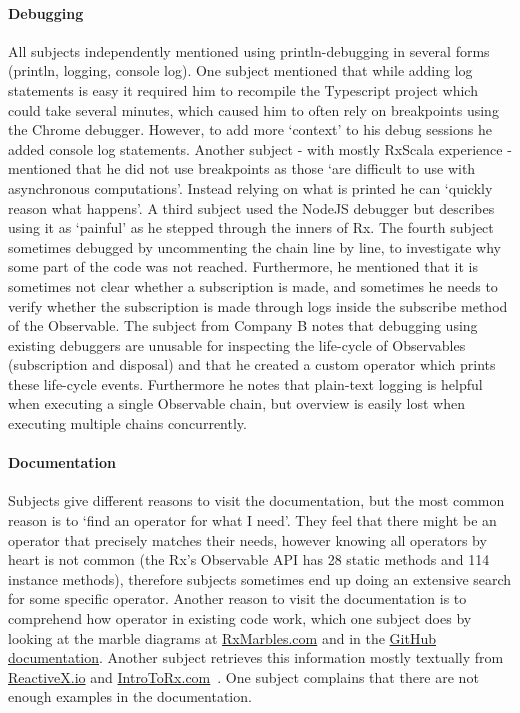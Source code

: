 \paragraph{Debugging}
All subjects independently mentioned using println-debugging in several forms (println, logging, console log).
One subject mentioned that while adding log statements is easy it required him to recompile the Typescript project which could take several minutes, 
which caused him to often rely on breakpoints using the Chrome debugger. However, to add more `context' to his debug sessions he added console log statements.
Another subject - with mostly RxScala experience - mentioned that he did not use breakpoints as those `are difficult to use with asynchronous computations'. 
Instead relying on what is printed he can `quickly reason what happens'.
A third subject used the NodeJS debugger but describes using it as `painful' as he stepped through the inners of Rx.
The fourth subject sometimes debugged by uncommenting the chain line by line, to investigate why some part of the code was not reached. Furthermore, he mentioned that it is sometimes not clear whether a subscription is made, and sometimes he needs to verify whether the subscription is made through logs inside the subscribe method of the Observable.
The subject from Company B notes that debugging using existing debuggers are unusable for inspecting the life-cycle of Observables (subscription and disposal) and that he created a custom  operator which prints these life-cycle events. Furthermore he notes that plain-text logging is helpful when executing a single Observable chain, but overview is easily lost when executing multiple chains concurrently.

\paragraph{Documentation}
Subjects give different reasons to visit the documentation, but the most common reason is to `find an operator for what I need'. They feel that there might be an operator that precisely matches their needs, however knowing all operators by heart is not common (the Rx's Observable API has 28 static methods and 114 instance methods), therefore subjects sometimes end up doing an extensive search for some specific operator. Another reason to visit the documentation is to comprehend how operator in existing code work, which one subject does by looking at the marble diagrams at \href{http://rxmarbles.com}{RxMarbles.com} and in the \href{https://github.com/Reactive-Extensions/RxJS/blob/master/doc/}{GitHub documentation}. Another subject retrieves this information mostly textually from \href{http://reactivex.io/rxjs}{ReactiveX.io} and \href{http://introtorx.com}{IntroToRx.com}~\cite{introtorx}. One subject complains that there are not enough examples in the documentation.

